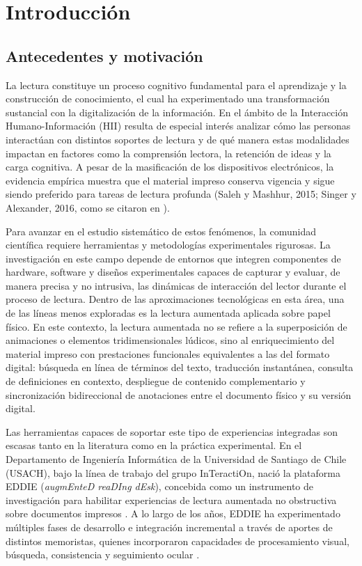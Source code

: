 \chapter{Introducción}
\label{cap:introduccion}

\section{Antecedentes y motivación}

La lectura constituye un proceso cognitivo fundamental para el aprendizaje y la construcción de conocimiento, el cual ha experimentado una transformación sustancial con la digitalización de la información. En el ámbito de la Interacción Humano-Información (HII) resulta de especial interés analizar cómo las personas interactúan con distintos soportes de lectura y de qué manera estas modalidades impactan en factores como la comprensión lectora, la retención de ideas y la carga cognitiva. A pesar de la masificación de los dispositivos electrónicos, la evidencia empírica muestra que el material impreso conserva vigencia y sigue siendo preferido para tareas de lectura profunda (Saleh y Mashhur, 2015; Singer y Alexander, 2016, como se citaron en \citealp{santibanez2020}).

Para avanzar en el estudio sistemático de estos fenómenos, la comunidad científica requiere herramientas y metodologías experimentales rigurosas. La investigación en este campo depende de entornos que integren componentes de hardware, software y diseños experimentales capaces de capturar y evaluar, de manera precisa y no intrusiva, las dinámicas de interacción del lector durante el proceso de lectura. Dentro de las aproximaciones tecnológicas en esta área, una de las líneas menos exploradas es la lectura aumentada aplicada sobre papel físico. En este contexto, la lectura aumentada no se refiere a la superposición de animaciones o elementos tridimensionales lúdicos, sino al enriquecimiento del material impreso con prestaciones funcionales equivalentes a las del formato digital: búsqueda en línea de términos del texto, traducción instantánea, consulta de definiciones en contexto, despliegue de contenido complementario y sincronización bidireccional de anotaciones entre el documento físico y su versión digital.

Las herramientas capaces de soportar este tipo de experiencias integradas son escasas tanto en la literatura como en la práctica experimental. En el Departamento de Ingeniería Informática de la Universidad de Santiago de Chile (USACH), bajo la línea de trabajo del grupo InTeractiOn, nació la plataforma EDDIE (\textit{augmEnteD reaDIng dEsk}), concebida como un instrumento de investigación para habilitar experiencias de lectura aumentada no obstructiva sobre documentos impresos \citep{carrasco2017}. A lo largo de los años, EDDIE ha experimentado múltiples fases de desarrollo e integración incremental a través de aportes de distintos memoristas, quienes incorporaron capacidades de procesamiento visual, búsqueda, consistencia y seguimiento ocular \citep{ibaceta2023}.

